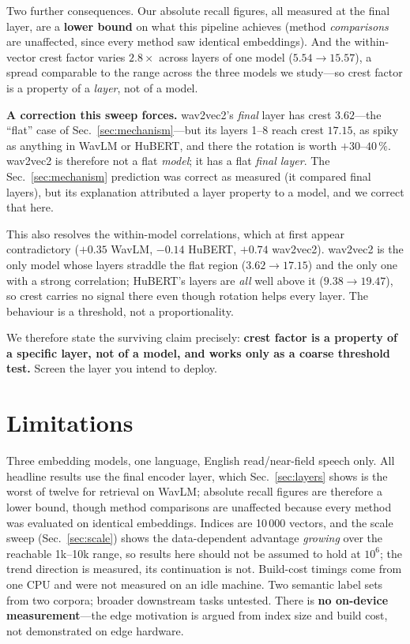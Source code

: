 \documentclass[conference]{IEEEtran}
\begin{document}
Two further consequences. Our absolute recall figures, all measured at the final layer, are a
\textbf{lower bound} on what this pipeline achieves (method \emph{comparisons} are unaffected,
since every method saw identical embeddings). And the within-vector crest factor varies
$\mathbf{2.8\times}$ across layers of one model ($5.54 \rightarrow 15.57$), a spread comparable to
the range across the three models we study---so crest factor is a property of a \emph{layer}, not
of a model.

\textbf{A correction this sweep forces.} wav2vec2's \emph{final} layer has crest $3.62$---the
``flat'' case of Sec.~\ref{sec:mechanism}---but its layers 1--8 reach crest $17.15$, as spiky as
anything in WavLM or HuBERT, and there the rotation is worth $+30$--$40\,\%$. wav2vec2 is therefore
not a flat \emph{model}; it has a flat \emph{final layer}. The Sec.~\ref{sec:mechanism} prediction
was correct as measured (it compared final layers), but its explanation attributed a layer property
to a model, and we correct that here.

This also resolves the within-model correlations, which at first appear contradictory ($+0.35$
WavLM, $-0.14$ HuBERT, $+0.74$ wav2vec2). wav2vec2 is the only model whose layers straddle the flat
region ($3.62 \rightarrow 17.15$) and the only one with a strong correlation; HuBERT's layers are
\emph{all} well above it ($9.38 \rightarrow 19.47$), so crest carries no signal there even though
rotation helps every layer. The behaviour is a threshold, not a proportionality.

We therefore state the surviving claim precisely: \textbf{crest factor is a property of a specific
layer, not of a model, and works only as a coarse threshold test.} Screen the layer you intend to
deploy.

\section{Limitations}

Three embedding models, one language, English read/near-field speech only. All headline results use
the final encoder layer, which Sec.~\ref{sec:layers} shows is the worst of twelve for retrieval on
WavLM; absolute recall figures are therefore a lower bound, though method comparisons are unaffected
because every method was evaluated on identical embeddings. Indices are 10\,000 vectors, and the
scale sweep (Sec.~\ref{sec:scale}) shows the data-dependent advantage \emph{growing} over the
reachable 1k--10k range, so results here should not be assumed to hold at $10^6$; the trend
direction is measured, its continuation is not. Build-cost timings come from one CPU and were not
measured on an idle machine. Two semantic label sets from two corpora; broader downstream tasks
untested. There is \textbf{no on-device measurement}---the edge motivation is argued from index
size and build cost, not demonstrated on edge hardware.
\end{document}
